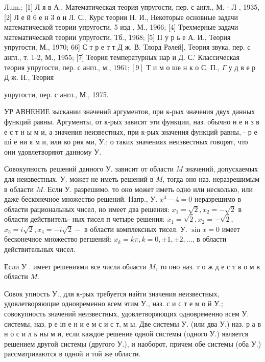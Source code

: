 \documentclass[10pt]{article}
\begin{document}
Лum.: [1] Л я в А., Математическая теория упругости, пер. с англ., М. - Л , 1935, [2] Л е й 6 е н 3 о н Л. С., Курс теории Н. И., Некоторые основные задачи математической теории упругости, 5 изд , М., 1966; [4] Трехмерные задачи математической теории упругости, Тб., 1968; [5] II у р ь е А. И., Теория упругости, М., 1970; 66] С т р е т т Д ж. В. Тлорд Рәлей], Теория звука, пер. с англ., т. 1-2, М., 1955; [7] Теория температурных нар и Д. С.' Классическая теория упругости, пер. с англ., м., $1961 ;[9]$ Т и м о ше н к о С. П., $\Gamma$ у д в е р Д ж. Н., Теория

упругости, пер. с англ., М., 1975.



УР АВНЕНИЕ зыскании значений аргументов, при к-рых значения двух данных функций равны. Аргументы, от к-рых зависят эти функции, наз. обычно н е и з в е с т н ы м и, а значения неизвестных, при к-рых значения функций равны, - р е ші е ни я м и, или ко рня ми, У.; о таких значениях неизвестных говорят, что они удовлетворяют данному У.



Совокупность решений данного У. зависит от области $M$ значений, допускаемых для неизвестных. У. может не иметь решений в $M$, тогда оно наз. неразрешимым в области $M$. Если У. разрешимо, то оно может иметь одно или несколько, или даже бесконечное множество решений. Напр., У. $x^{4}-4=0$ неразрешимо в области рациональных чисел, но имеет два решения: $x_{1}=\sqrt{2}, x_{2}=-\sqrt{2}$ в области действитель- ных тисел п четыре решения: $x_{1}=\sqrt{\overline{2}}, x_{2}=-\sqrt{\overline{2}}$, $x_{3}=i \sqrt{2}, x_{4}=-i \sqrt{2}-$ в области комплексных тисел. У. $\sin x=0$ имеет бесконечное множество регшений: $x_{k}=k \pi, k=0, \pm 1, \pm 2, \ldots$, в области действительных чисел.



Если У . имеет решениями все числа области $M$, то оно наз. т о ж д е с т в $о$ м в области $M$.



Совок упность У., для к-рых требуется найти значения неизвестных, удовлетворяющие одновременно всем этим У., наз. с и с т е м о й У.; совокупность значений неизвестных, удовлетворяющих одновременно всем У. системы, наз. р е іп е н и е м с и с т, м ы. Две системы У. (или два У.) наз. р а в н о с и л ь ны м и, если каждое решение одной системы (одного У.) является решением другой системы (другого У.), и наоборот, причем обе системы (оба У.) рассматриваются в одной и той же области.
\end{document}
